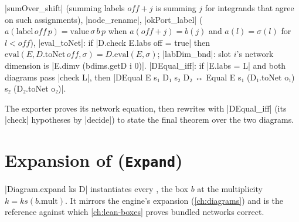 \begin{theorem}
\lean|sumOver_shift| (summing labels $off+j$ is summing $j$ for integrands that agree on such
assignments), \lean|node_rename|, \lean|okPort_label| ($a(\mathrm{label}\,off\,p)=\mathrm{value}\,\sigma\,b\,p$ when
$a(off+j)=b(j)$ and $a(l)=\sigma(l)$ for $l<off$), \lean|eval_toNet|: if
\lean|D.check E.labs off = true| then $\mathrm{eval}(E,D.\mathrm{toNet}\,off,\sigma)=D.\mathrm{eval}(E,\sigma)$;
\lean|labDim_bnd|: slot $i$'s network dimension is \lean|E.dimv (bdims.getD i 0)|.
\lean|DEqual_iff|: if \lean|E.labs = L| and both diagrams pass \lean|check L|, then
\lean|DEqual E s₁ D₁ s₂ D₂ ↔ Equal E s₁ (D₁.toNet o₁) s₂ (D₂.toNet o₂)|.
\end{theorem}
The exporter proves its network equation, then rewrites with \lean|DEqual_iff| (its \lean|check|
hypotheses by \lean|decide|) to state the final theorem over the two diagrams.

\section{Expansion of \texorpdfstring{\bboxes}{!-boxes} (\texttt{Expand})}\label{sec:lean-core-expand}

\lean|Diagram.expand ks D| instantiates every \bbox{}, the box $b$ at the multiplicity
$k=ks(b.\mathrm{mult})$. It mirrors the engine's expansion (\cref{ch:diagrams}) and is the reference
against which \cref{ch:lean-boxes} proves bundled networks correct.

